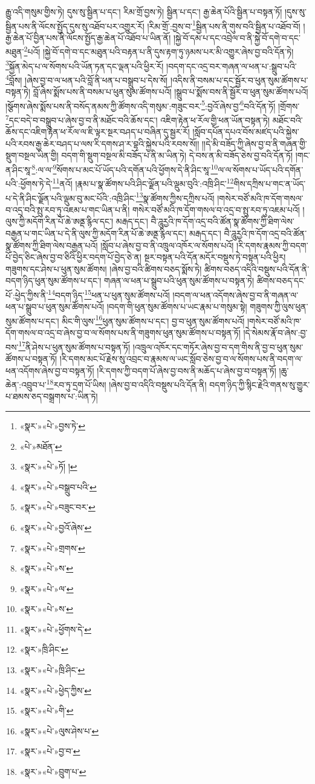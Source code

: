 རྒྱུ་འདི་གསུམ་གྱིས་ཏེ། དུས་སུ་སྦྱིན་པ་དང་། རིམ་གྲོ་བྱས་ཏེ། སྦྱིན་པ་དང་། རྒྱ་ཆེན་པོའི་སྦྱིན་པ་བསྟན་ཏོ། །དུས་སུ་སྦྱིན་པས་ནི་ལོངས་སྤྱོད་དུས་སུ་འཐོབ་པར་འགྱུར་རོ། །རིམ་གྲོ་:བྱས་བ་\footnote{«སྣར་»«པེ་»བྱས་ཏེ་}སྦྱིན་པས་ནི་གུས་བའི་སྦྱིན་པ་འཐོབ་བོ། །རྒྱ་ཆེན་པོ་བྱིན་པས་ནི་ལོངས་སྤྱོད་རྒྱ་ཆེན་པོ་འཐོབ་པ་ཡིན་ནོ། །སྐྱེ་བོ་དམ་པ་དང་འབྲེལ་བ་ནི་སྐྱེ་བོ་དགེ་བ་དང་མཐུན་\footnote{«པེ་»མཐོན་}པའོ། །སྐྱེ་བོ་དགེ་བ་དང་མཐུན་པའི་བརྟན་པ་ནི་དུས་རྟག་ཏུ་ཉམས་པར་མི་འགྱུར་ཞེས་བྱ་བའི་དོན་ཏེ། \footnote{«སྣར་»«པེ་»ཏོ། ། }སྐྱོན་མེད་པ་ལ་སོགས་པའི་ཡོན་ཏན་དང་ལྡན་པའི་ཕྱིར་རོ། །བདག་དང་འདྲ་བར་གཞན་ལ་ཕན་པ་:སྒྲུབ་པའི་\footnote{«སྣར་»«པེ་»བསྒྲུབ་པའི་}བློས། །ཞེས་བྱ་བ་ལ་ཕན་པའི་བློ་ནི་ཕན་པ་བསྒྲུབ་པ་དེས་སོ། །འདིས་ནི་བསམ་པ་དང་སྦྱོར་བ་ཕུན་སུམ་ཚོགས་པ་བསྟན་ཏེ། བློ་ཞེས་སྨོས་པས་ནི་བསམ་པ་ཕུན་སུམ་ཚོགས་པའོ། །སྒྲུབ་པ་སྨོས་བས་ནི་སྦྱོར་བ་ཕུན་སུམ་ཚོགས་པའོ། །སྩོགས་ཞེས་སྨོས་པས་ནི་བསོད་ནམས་ཀྱི་ཚོགས་འདི་གསུམ་:གཟུང་བར་\footnote{«སྣར་»«པེ་»བཟུང་བར་}:བྱའོ་ཞེས་བྱ་\footnote{«སྣར་»«པེ་»བྱའོ་ཞེས་}བའི་དོན་ཏོ། །གྲོགས་\footnote{«སྣར་»«པེ་»གྲགས་}དང་བདེ་བ་བསྒྲུབ་པ་ཞེས་བྱ་བ་ནི་མཐོང་བའི་ཆོས་དང་། འཇིག་རྟེན་ཕ་རོལ་གྱི་ཕན་ཡོན་བསྟན་ཏེ། མཐོང་བའི་ཆོས་དང་འཇིག་རྟེན་ཕ་རོལ་ལ་ཇི་ལྟར་སྔར་བཤད་པ་བཞིན་དུ་སྦྱར་རོ། །སློབ་དཔོན་དཔའ་བོས་མཛད་པའི་སྐྱེས་པའི་རབས་རྒྱ་ཆེར་བཤད་པ་ལས་རི་དགས་ཤ་ར་བྷའི་སྐྱེས་པའི་རབས་སོ།། །།དེ་མི་བཟོད་ཀྱི་ཞེས་བྱ་བ་ནི་གཞན་གྱི་སྡུག་བསྔལ་ཡིན་གྱི། བདག་གི་སྡུག་བསྔལ་མི་བཟོད་པ་ནི་མ་ཡིན་ཏེ། དེ་བས་ན་མི་བཟོད་ཅེས་བྱ་བའི་དོན་ཏོ། །གང་ན་ཤིང་སཱ་\footnote{«སྣར་»«པེ་»ས་}:ལ་ལ་\footnote{«སྣར་»«པེ་»ལ་}སོགས་པ་མང་པོ་ཡོད་པའི་དགོན་པའི་ཕྱོགས་དེ་ནི་ཤིང་སཱ་\footnote{«སྣར་»«པེ་»ས་}ལ་ལ་སོགས་པ་ཡོད་པའི་དགོན་པའི་:ཕྱོགས་ཏེ་དེ་\footnote{«སྣར་»«པེ་»ཕྱོགས་དེ་}ནའོ། །རྣམ་པ་སྣ་ཚོགས་པའི་ཤིང་ལྗོན་པའི་ལྡུམ་བུའི་:འཁྲི་ཤིང་\footnote{«སྣར་»ཁྲི་ཤིང་}གིས་དཀྲིས་པ་གང་ན་ཡོད་པ་དེ་ནི་ཤིང་ལྗོན་པའི་ལྡུམ་བུ་མང་པོའི་:འཁྲི་ཤིང་\footnote{«སྣར་»«པེ་»ཁྲི་ཤིང་}སྣ་ཚོགས་ཀྱིས་དཀྲིས་པའོ། །གསེར་བཙོ་མའི་ཁ་དོག་གསལ་བ་འདྲ་བའི་སྤུ་རབ་ཏུ་འཇམ་པ་གང་ཡིན་པ་ནི། གསེར་བཙོ་མའི་ཁ་དོག་གསལ་བ་འདྲ་བ་སྤུ་རབ་ཏུ་འཇམ་པའོ། །ལུས་ཀྱི་མདོག་རིན་པོ་ཆེ་ཨནྡ་རྙིལ་དང་། མརྒད་དང་། བཻ་ཌཱུརྱའི་ཁ་དོག་འདྲ་བའི་ཚོན་སྣ་ཚོགས་ཀྱི་ཐིག་ལེས་བརྒྱན་པ་གང་ཡིན་པ་དེ་ནི་ལུས་ཀྱི་མདོག་རིན་པོ་ཆེ་ཨནྡ་རྙིལ་དང་། མརྒད་དང་། བཻ་ཌཱུརྱའི་ཁ་དོག་འདྲ་བའི་ཚོན་སྣ་ཚོགས་ཀྱི་ཐིག་ལེས་བརྒྱན་པའོ། །སློབ་པ་ཞེས་བྱ་བ་ནི་འཁྲུལ་འཁོར་ལ་སོགས་པའོ། །རི་དགས་རྣམས་ཀྱི་བདག་པོ་བྱེད་ཅིང་ཞེས་བྱ་བ་ཅིའི་ཕྱིར་བདག་པོ་བྱེད་ཅེ་ན། སྔར་བསྟན་པའི་དོན་མདོར་བསྡུས་ཏེ་བསྟན་པའི་ཕྱིར། གཟུགས་དང་ཤེས་པ་ཕུན་སུམ་ཚོགས། །ཞེས་བྱ་བའི་ཚིགས་བཅད་སྨོས་ཏེ། ཚིགས་བཅད་འདིའི་བསྡུས་པའི་དོན་ནི་བདག་ཉིད་ཕུན་སུམ་ཚོགས་པ་དང་། གཞན་ལ་ཕན་པ་སྒྲུབ་པའི་ཕུན་སུམ་ཚོགས་པ་བསྟན་ཏེ། ཚིགས་བཅད་དང་པོ་:ཕྱེད་ཀྱིས་ནི་\footnote{«སྣར་»«པེ་»ཕྱེད་ཀྱིས་}བདག་ཉིད་\footnote{«སྣར་»«པེ་»གི་}ཕན་པ་ཕུན་སུམ་ཚོགས་པའོ། །བདག་ལ་ཕན་འདོགས་ཞེས་བྱ་བ་ནི་གཞན་ལ་ཕན་པ་སྒྲུབ་པ་ཕུན་སུམ་ཚོགས་པའོ། །བདག་གི་ཕུན་སུམ་ཚོགས་པ་ཡང་རྣམ་པ་གསུམ་སྟེ། གཟུགས་ཀྱི་ལུས་ཕུན་སུམ་ཚོགས་པ་དང་། མིང་གི་ལུས་\footnote{«སྣར་»«པེ་»ལུས་ཤེས་པ་}ཕུན་སུམ་ཚོགས་པ་དང་། བྱ་བ་ཕུན་སུམ་ཚོགས་པའོ། །གསེར་བཙོ་མའི་ཁ་དོག་གསལ་བ་འདྲ་བ་ཞེས་བྱ་བ་ལ་སོགས་པས་ནི་གཟུགས་ཕུན་སུམ་ཚོགས་པ་བསྟན་ཏོ། །དེ་སེམས་རྣོ་བ་ཞེས་:བྱ་བས་\footnote{«སྣར་»«པེ་»བྱ་བ་}ནི་ཤེས་པ་ཕུན་སུམ་ཚོགས་པ་བསྟན་ཏོ། །འཁྲུལ་འཁོར་དང་གཏོར་ཞེས་བྱ་བ་དག་གིས་ནི་བྱ་བ་ཕུན་སུམ་ཚོགས་པ་བསྟན་ཏོ། །རི་དགས་མང་པོ་རྗེས་སུ་འབྲང་བ་རྣམས་ལ་ཡང་སློབ་ཅེས་བྱ་བ་ལ་སོགས་པས་ནི་བདག་ལ་ཕན་འདོགས་ཞེས་བྱ་བ་བསྟན་ཏོ། །རི་དགས་ཀྱི་བདག་པོ་ཞེས་བྱ་བས་ནི་མཆོད་པ་ཞེས་བྱ་བ་བསྟན་ཏོ། །ཆུ་ཆེན་:འབྲུབ་པ་\footnote{«སྣར་»«པེ་»བྲུག་པ་}རབ་ཏུ་དྲག་པོ་ཡིས། །ཞེས་བྱ་བ་འདིའི་བསྡུས་པའི་དོན་ནི། བདག་ཉིད་ཀྱི་སྙིང་རྗེའི་གནས་སུ་གྱུར་པ་ཐམས་ཅད་བསྒྲགས་པ་:ཡིན་ཏེ། 